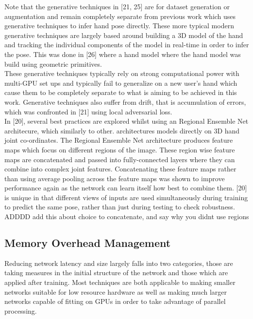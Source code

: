 \documentclass{article}
\begin{document}
Note that the generative techniques in [21, 25] are for dataset generation or augmentation and remain completely separate from previous work which uses generative techniques to infer hand pose directly. These more typical modern generative techniques are largely based around building a 3D model of the hand and tracking the individual components of the model in real-time in order to infer the pose. This was done  in [26] where a hand model  where the hand model was build using geometric primitives.\\

These generative techniques typically rely on strong computational power with multi-GPU set ups and typically fail to generalize on a new user's hand which cause them to be completely separate to what is aiming to be achieved in this work. Generative techniques also suffer from drift, that is accumulation of errors, which was confronted in [21] using local adversarial loss.\\ 

In [20], several best practices are explored whilst using an Regional Ensemble Net architecure, which similarly to other. architectures models directly on 3D hand joint co-ordinates. The Regional Ensemble Net architecture produces feature maps which focus on different regions of the image. These region wise feature maps are concatenated and passed into fully-connected layers where they can combine into complex joint features. Concatenating these feature maps rather than using average pooling across the feature maps was shown to improve performance again as the network can learn itself how best to combine them. [20] is unique in that different views of inputs are used simultaneously during training to predict the same pose, rather than just during testing to check robustness. \\
ADDDD add this about choice to concatenate, and say why you didnt use regions

\subsection{Memory Overhead Management}
Reducing network latency and size largely falls into two categories, those are taking measures in the initial structure of the network and those which are applied after training. Most techniques are both applicable to making smaller networks suitable for low resource hardware as well as making much larger networks capable of fitting on GPUs in order to take advantage of parallel processing.
\end{document}
